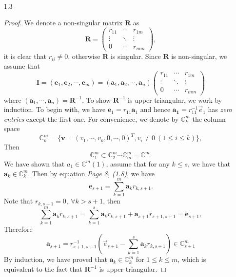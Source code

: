 \begin{enumerate}
    \item [1.3] {
    \begin{proof}
    We denote a non-singular matrix $\bm{R}$ as
    $$
    \bm{R} = \left(\begin{array}{ccc}
         r_{11} & \cdots & r_{1m}  \\
         \vdots & \ddots & \vdots \\
         0 & \cdots & r_{mm}
    \end{array}\right),
    $$
    it is clear that $r_{ii} \neq 0$, otherwise $\bm{R}$ is singular. Since $\bm{R}$ is non-singular, we assume that
    \[ \bm{I} = (\bm{e}_1, \bm{e}_2, \cdots, \bm{e}_{m}) = (\bm{a}_1, \bm{a}_2, \cdots, \bm{a}_n)\left(\begin{array}{ccc}
         r_{11} & \cdots & r_{1m}  \\
         \vdots & \ddots & \vdots \\
         0 & \cdots & r_{mm}
    \end{array}\right)
    \]
    where $(\bm{a}_1, \cdots, \bm{a}_n) = \bm{R}^{-1}$. To show $\bm{R}^{-1}$ is upper-triangular, we work by induction. To begin with, we have $\bm{e}_1 = r_{11} \bm{a}_1$ and hence $\bm{a_1} = r_{11}^{-1} \vec{e}_1$ has \textit{zero entries} except the first one. For convenience, we denote by $\mathbb{C}^{m}_{k}$ the column space
    \[ \mathbb{C}_{k}^{m} = \{ \bm{v} = (v_1, \cdots, v_{k}, 0,\cdots, 0)^{T}, v_{i} \neq 0 ~(1\leq i \leq k)\}, \]
    Then
    \[ \mathbb{C}^{m}_1 \subset \mathbb{C}^{m}_{2} \cdots \mathbb{C}^{m}_{m}  = \mathbb{C}^{m}. \]
    We have shown that $a_1 \in \mathbb{C}^{m}(1)$, assume that for any $k \leq s$, we have that $\mathbf{a}_k \in \mathbb{C}^{m}_{k}$. Then by equation \textit{Page 8, (1.8)}, we have
    \[\bm{e}_{s+1} = \sum_{k=1}^{m} \bm{a}_k r_{k,s+1}.\]
    Note that $r_{k,s+1} = 0, ~\forall k > s+1$, then
    \[ \sum_{k=1}^{m} \bm{a}_k r_{k, s+1} = \sum_{k = 1}^{s} \bm{a}_k r_{k, s+1} + \bm{a}_{s+1} r_{s+1, s+1} = \bm{e}_{s+1},\]
    Therefore
    \[ \bm{a}_{s+1} = r_{s+1,s+1}^{-1} (\vec{e}_{s+1} - \sum_{k=1}^{s} \bm{a}_{k} r_{k,s+1}) \in \mathbb{C}^{m}_{s+1}\]
    By induction, we have proved that $\bm{a}_{k} \in \mathbb{C}^{m}_{k}$ for $1 \leq k \leq m$, which is equivalent to the fact that $\bm{R}^{-1}$ is upper-triangular.
    \end{proof}
    }
    

\end{enumerate}
